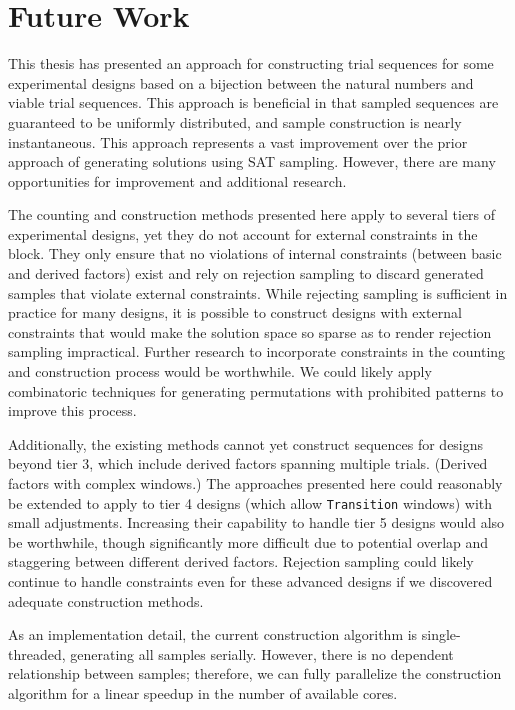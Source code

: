 
\chapter{Future Work}

This thesis has presented an approach for constructing trial sequences for some experimental designs based on a bijection between the natural numbers and viable trial sequences. This approach is beneficial in that sampled sequences are guaranteed to be uniformly distributed, and sample construction is nearly instantaneous. This approach represents a vast improvement over the prior approach of generating solutions using SAT sampling. However, there are many opportunities for improvement and additional research.

The counting and construction methods presented here apply to several tiers of experimental designs, yet they do not account for external constraints in the block. They only ensure that no violations of internal constraints (between basic and derived factors) exist and rely on rejection sampling to discard generated samples that violate external constraints. While rejecting sampling is sufficient in practice for many designs, it is possible to construct designs with external constraints that would make the solution space so sparse as to render rejection sampling impractical. Further research to incorporate constraints in the counting and construction process would be worthwhile. We could likely apply combinatoric techniques for generating permutations with prohibited patterns to improve this process.

Additionally, the existing methods cannot yet construct sequences for designs beyond tier 3, which include derived factors spanning multiple trials. (Derived factors with complex windows.) The approaches presented here could reasonably be extended to apply to tier 4 designs (which allow \texttt{Transition} windows) with small adjustments. Increasing their capability to handle tier 5 designs would also be worthwhile, though significantly more difficult due to potential overlap and staggering between different derived factors. Rejection sampling could likely continue to handle constraints even for these advanced designs if we discovered adequate construction methods.

As an implementation detail, the current construction algorithm is single-threaded, generating all samples serially. However, there is no dependent relationship between samples; therefore, we can fully parallelize the construction algorithm for a linear speedup in the number of available cores.


